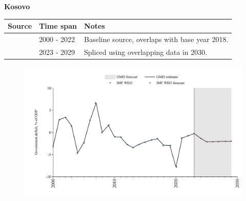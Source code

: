\documentclass[12pt,a4paper,landscape]{article}
\begin{document}
\begin{adjustbox}{max totalsize={\paperwidth}{\paperheight},center}
\begin{minipage}[t][\textheight][t]{\textwidth}
\vspace*{0.5cm}
{}
\begin{center}
{\Large\bfseries Kosovo}
\end{center}
\vspace{0.5cm}
\begin{table}[H]
\centering
\small
\begin{tabular}{|l|l|l|}
\hline
\textbf{Source} & \textbf{Time span} & \textbf{Notes} \\
\hline
\rowcolor{white}\cite{IMF_WEO}& 2000 - 2022 &Baseline source, overlaps with base year 2018.\\
\rowcolor{lightgray}\cite{IMF_WEO_forecast}& 2023 - 2029 &Spliced using overlapping data in 2030.\\
\hline
\end{tabular}
\end{table}
\begin{figure}[H]
\centering
\includegraphics[width=\textwidth,height=0.6\textheight,keepaspectratio]{graphs/XKX_govdef_GDP.pdf}
\end{figure}
\end{minipage}
\end{adjustbox}
\end{document}
